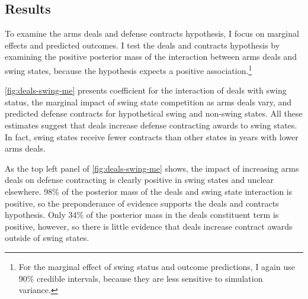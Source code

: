 \documentclass[12pt]{article}
\begin{document}




\subsection{Results}


To examine the arms deals and defense contracts hypothesis, I focus on marginal effects and predicted outcomes.
I test the deals and contracts hypothesis by examining the positive posterior mass of the interaction between arms deals and swing states, because the hypothesis expects a positive association.\footnote{For the marginal effect of swing status and outcome predictions, I again use 90\% credible intervals, because they are less sensitive to simulation variance.}


\autoref{fig:deals-swing-me} presents coefficient for the interaction of deals with swing status, the marginal impact of swing state competition as arms deals vary, and predicted defense contracts for hypothetical swing and non-swing states. 
All these estimates suggest that deals increase defense contracting awards to swing states. 
In fact, swing states receive fewer contracts than other states in years with lower arms deals. 


As the top left panel of \autoref{fig:deals-swing-me} shows, the impact of increasing arms deals on defense contracting is clearly positive in swing states and unclear elsewhere.
98\% of the posterior mass of the deals and swing state interaction is positive, so the preponderance of evidence supports the deals and contracts hypothesis.
Only 34\% of the posterior mass in the deals constituent term is positive, however, so there is little evidence that deals increase contract awards outside of swing states. 
\end{document}
